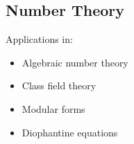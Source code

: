 \documentclass[11pt]{article}
\theoremstyle{definition}
\begin{document}
\subsection{Number Theory}
Applications in:
\begin{itemize}
    \item Algebraic number theory
    \item Class field theory
    \item Modular forms
    \item Diophantine equations
\end{itemize}
\end{document}
